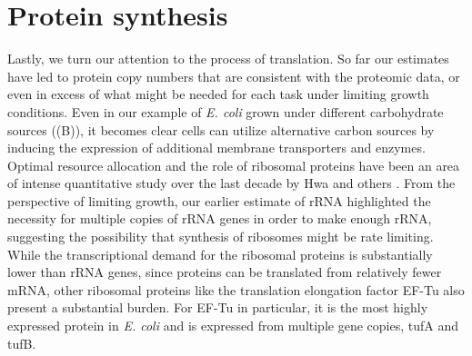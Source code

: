 \section{Protein synthesis}

Lastly, we turn our attention to the process of translation. So far our
estimates have led to protein copy numbers that are consistent with the
proteomic data, or even in excess of what might be needed for each task under
limiting growth conditions. Even in our example of \textit{E. coli} grown under
different carbohydrate sources ((B)), it becomes clear cells can utilize
alternative carbon sources by inducing the expression of additional membrane
transporters and enzymes. Optimal resource allocation and the role of ribosomal
proteins have been an area of intense quantitative study over the last decade by
Hwa and others \citep{scott2010, hui2015}. From the perspective of limiting
growth, our earlier estimate of rRNA highlighted the necessity for multiple
copies of rRNA genes in order to make enough rRNA, suggesting the possibility
that synthesis of ribosomes might be rate limiting. While the transcriptional
demand for  the ribosomal proteins is substantially lower than rRNA genes, since
proteins can be translated from relatively fewer mRNA, other ribosomal
proteins like the translation elongation factor EF-Tu also present a substantial
burden. For EF-Tu  in particular, it is the most highly expressed protein in
\textit{E. coli} and is expressed from multiple gene copies, tufA and
tufB.



